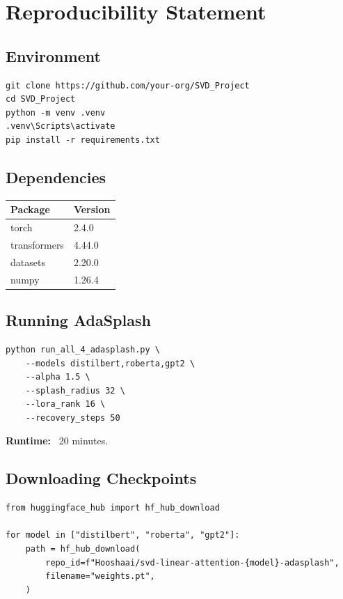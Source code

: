 
\section{Reproducibility Statement}

\subsection{Environment}

\begin{lstlisting}
git clone https://github.com/your-org/SVD_Project
cd SVD_Project
python -m venv .venv
.venv\Scripts\activate
pip install -r requirements.txt
\end{lstlisting}

\subsection{Dependencies}

\begin{table}[H]
\centering
\small
\begin{tabular}{ll}
\toprule
\textbf{Package} & \textbf{Version} \\
\midrule
torch & 2.4.0 \\
transformers & 4.44.0 \\
datasets & 2.20.0 \\
numpy & 1.26.4 \\
\bottomrule
\end{tabular}
\end{table}

\subsection{Running AdaSplash}

\begin{lstlisting}
python run_all_4_adasplash.py \
    --models distilbert,roberta,gpt2 \
    --alpha 1.5 \
    --splash_radius 32 \
    --lora_rank 16 \
    --recovery_steps 50
\end{lstlisting}

\textbf{Runtime:} ~20 minutes.

\subsection{Downloading Checkpoints}

\begin{lstlisting}
from huggingface_hub import hf_hub_download

for model in ["distilbert", "roberta", "gpt2"]:
    path = hf_hub_download(
        repo_id=f"Hooshaai/svd-linear-attention-{model}-adasplash",
        filename="weights.pt",
    )
\end{lstlisting}

